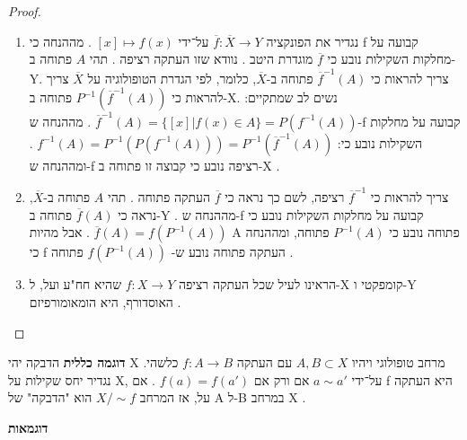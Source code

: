 \documentclass{tstextbook}
\begin{document}
\begin{proof}
  \begin{enumerate}
    \item נגדיר את הפונקציה \(\overline{f}:\overline{X}\rightarrow Y\) על־ידי \([x]\mapsto f(x)\) . מההנחה כי f קבועה על מחלקות השקילות נובע כי \(\overline{f}\) מוגדרת היטב . נוודא שזו העתקה רציפה . תהי \(A\) פתוחה ב-Y. צריך להראות כי \(\overline{f}^{-1}(A)\) פתוחה ב-\(\overline{X}\), כלומר, לפי הגדרת הטופולוגיה על \(\overline{X}\) צריך להראות כי \(P^{-1}(\overline{f}^{-1}(A))\) פתוחה ב-X. 
נשים לב שמתקיים: \(\overline{f}^{-1}(A)=\{[x]|f(x)\in A\}=P(f^{-1}(A))\) .
מההנחה ש-f קבועה על מחלקות השקילות נובע כי: \(f^{-1}(A)=P^{-1}(P(f^{-1}(A)))=P^{-1}(\overline{f}^{-1}(A))\) .
ומההנחה ש-f רציפה נובע כי קבוצה זו פתוחה ב-X .


    \item צריך להראות כי \(\overline{f}^{-1}\) רציפה, לשם כך נראה כי \(\overline{f}\) העתקה פתוחה . תהי \(A\) פתוחה ב-\(\overline{X}\), נראה כי \(\overline{f}(A)\) פתוחה ב-Y . מההנחה ש-f קבועה על מחלקות השקילות נובע כי \(\overline{f}(A)=f(P^{-1}(A))\) . אבל מהיות A פתוחה נובע כי \(P^{-1}(A)\) פתוחה, ומההנחה כי f העתקה פתוחה נובע ש- \(f(P^{-1}(A))\) פתוחה . 


    \item הראינו לעיל שכל העתקה רציפה \(f:X\rightarrow Y\) שהיא חח"ע ועל, ל-X קומפקטי ו-Y האוסדורף, היא הומאומורפיזם . 


  \end{enumerate}
\end{proof}
\textbf{דוגמה כללית} הדבקה
יהי X מרחב טופולוגי ויהיו \(A,B\subset X\) עם העתקה \(f:A\rightarrow B\) כלשהי. נגדיר יחס שקילות על X, על־ידי \(a\sim a'\) אם ורק אם \(f(a)=f(a')\) . אם f היא העתקה על, אז המרחב \(X/\sim f\) הוא "הדבקה" של A ל-B במרחב X .

\textbf{דוגמאות}
\end{document}
